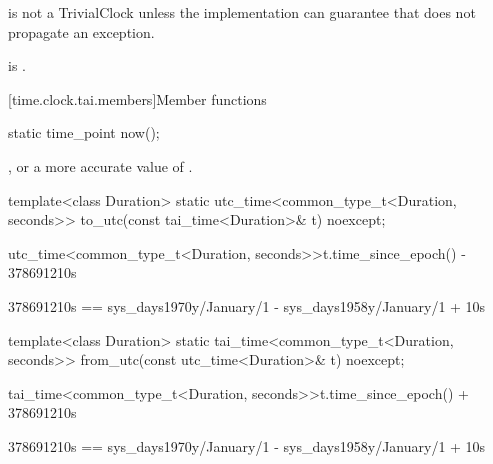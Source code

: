 \pnum
{} is not a TrivialClock
unless the implementation can guarantee that 
does not propagate an exception.
\begin{note}
 is .
\end{note}

[time.clock.tai.members]{Member functions}

%
\begin{itemdecl}
static time_point now();
\end{itemdecl}

\begin{itemdescr}
\pnum
\returns {}, or a more accurate value of .
\end{itemdescr}

%
\begin{itemdecl}
template<class Duration>
  static utc_time<common_type_t<Duration, seconds>>
    to_utc(const tai_time<Duration>& t) noexcept;
\end{itemdecl}

\begin{itemdescr}
\pnum
\returns
\begin{codeblock}
utc_time<common_type_t<Duration, seconds>>{t.time_since_epoch()} - 378691210s
\end{codeblock}
\begin{note}
\begin{codeblock}
378691210s == sys_days{1970y/January/1} - sys_days{1958y/January/1} + 10s
\end{codeblock}
\end{note}
\end{itemdescr}

%
\begin{itemdecl}
template<class Duration>
  static tai_time<common_type_t<Duration, seconds>>
    from_utc(const utc_time<Duration>& t) noexcept;
\end{itemdecl}

\begin{itemdescr}
\pnum
\returns
\begin{codeblock}
tai_time<common_type_t<Duration, seconds>>{t.time_since_epoch()} + 378691210s
\end{codeblock}
\begin{note}
\begin{codeblock}
378691210s == sys_days{1970y/January/1} - sys_days{1958y/January/1} + 10s
\end{codeblock}
\end{note}
\end{itemdescr}

